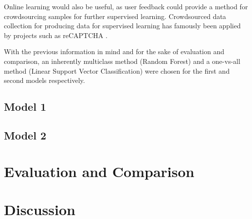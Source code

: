 \documentclass[12pt]{article}
\begin{document}
Online learning would also be useful, as user feedback could provide a method for crowdsourcing samples for further supervised learning. Crowdsourced data collection for producing data for supervised learning has famously been applied by projects such as reCAPTCHA \cite{captcha}.

With the previous information in mind and for the sake of evaluation and comparison, an inherently multiclass method (Random Forest) and a one-vs-all method (Linear Support Vector Classification) were chosen for the first and second models respectively.

\subsection{Model 1}


\subsection{Model 2}


\section{Evaluation and Comparison}
\section{Discussion}



\end{document}
